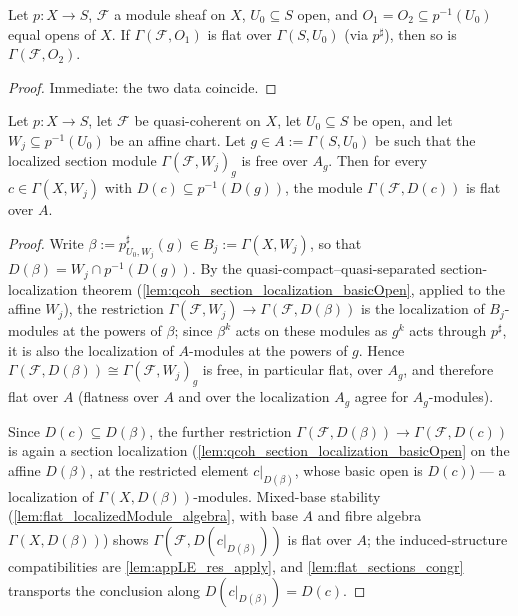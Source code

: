 \begin{lemma}
  \leanok
  \label{lem:flat_sections_congr}
  Let \(p : X \to S\), \(\mathcal F\) a module sheaf on \(X\),
  \(U_0 \subseteq S\) open, and \(O_1 = O_2 \subseteq p^{-1}(U_0)\) equal
  opens of \(X\). If \(\Gamma(\mathcal F, O_1)\) is flat over
  \(\Gamma(S, U_0)\) (via \(p^\sharp\)), then so is
  \(\Gamma(\mathcal F, O_2)\).
\end{lemma}
\begin{proof}
  \leanok
  Immediate: the two data coincide.
\end{proof}

\begin{lemma}
  \leanok
  \label{lem:flat_section_chartBasic}
  Let \(p : X \to S\), let \(\mathcal F\) be quasi-coherent on \(X\), let
  \(U_0 \subseteq S\) be open, and let \(W_j \subseteq p^{-1}(U_0)\) be an
  affine chart. Let \(g \in A := \Gamma(S, U_0)\) be such that the localized
  section module \(\Gamma(\mathcal F, W_j)_g\) is free over \(A_g\). Then for
  every \(c \in \Gamma(X, W_j)\) with \(D(c) \subseteq p^{-1}(D(g))\), the
  module \(\Gamma(\mathcal F, D(c))\) is flat over \(A\).
\end{lemma}
\begin{proof}
  \leanok
  Write \(\beta := p^\sharp_{U_0, W_j}(g) \in B_j := \Gamma(X, W_j)\), so that
  \(D(\beta) = W_j \cap p^{-1}(D(g))\). By the quasi-compact--quasi-separated
  section-localization theorem
  (\cref{lem:qcoh_section_localization_basicOpen}, applied to the affine
  \(W_j\)), the restriction
  \(\Gamma(\mathcal F, W_j) \to \Gamma(\mathcal F, D(\beta))\) is the
  localization of \(B_j\)-modules at the powers of \(\beta\); since
  \(\beta^k\) acts on these modules as \(g^k\) acts through \(p^\sharp\), it
  is also the localization of \(A\)-modules at the powers of \(g\). Hence
  \(\Gamma(\mathcal F, D(\beta)) \cong \Gamma(\mathcal F, W_j)_g\) is free,
  in particular flat, over \(A_g\), and therefore flat over \(A\) (flatness
  over \(A\) and over the localization \(A_g\) agree for
  \(A_g\)-modules).

  Since \(D(c) \subseteq D(\beta)\), the further restriction
  \(\Gamma(\mathcal F, D(\beta)) \to \Gamma(\mathcal F, D(c))\) is again a
  section localization (\cref{lem:qcoh_section_localization_basicOpen} on the
  affine \(D(\beta)\), at the restricted element \(c|_{D(\beta)}\), whose
  basic open is \(D(c)\)) — a localization of
  \(\Gamma(X, D(\beta))\)-modules. Mixed-base stability
  (\cref{lem:flat_localizedModule_algebra}, with base \(A\) and fibre algebra
  \(\Gamma(X, D(\beta))\)) shows \(\Gamma(\mathcal F, D(c|_{D(\beta)}))\) is
  flat over \(A\); the induced-structure compatibilities are
  \cref{lem:appLE_res_apply}, and \cref{lem:flat_sections_congr} transports
  the conclusion along \(D(c|_{D(\beta)}) = D(c)\).
\end{proof}

